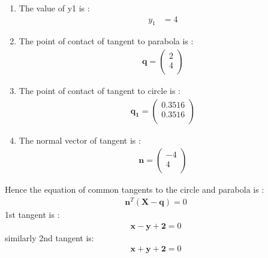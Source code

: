 \documentclass[journal,10pt,twocolumn]{article}
\let\vec\mathbf
\begin{document}
\begin{enumerate}
\item The value of y1 is :
\begin{align}
y_1&=4
\end{align}
 \item The point of contact of tangent to parabola is :
\begin{align}
\vec{q}=
\begin{pmatrix}
2 \\
4 \\
\end{pmatrix}
\end{align}
\item The point of contact of tangent to circle is :
\begin{align}
\vec{q_1}=
\begin{pmatrix}
0.3516 \\
0.3516 \\
\end{pmatrix}
\end{align}
\item The normal vector of tangent is :
\begin{align}
\vec{n}=
\begin{pmatrix}
-4 \\
4 \\
\end{pmatrix}
\end{align}
\end{enumerate}
Hence the equation of common tangents to the circle and parabola is :
\begin{align}
\vec{n}^{T}(\vec{X}-\vec{q})=0
\end{align}
1st tangent is :
\begin{align}
\vec{x-y+2}=0
\end{align}
similarly 2nd tangent is: 
\begin{align}
\vec{x+y+2}=0
\end{align}
\end{document}
